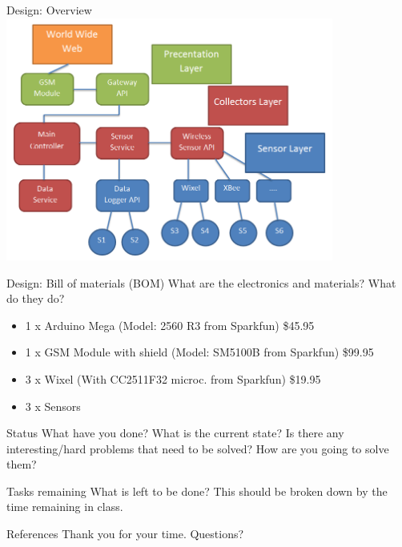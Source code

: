 \documentclass{beamer}
\begin{document}
\begin{frame}{Design: Overview}
\includegraphics[height=8cm]{graphics/softwareArchitecture.png}
\end{frame}

\begin{frame}{Design: Bill of materials (BOM)}
What are the electronics and materials?  What do they do? 

\begin{itemize}
\item 1 x Arduino Mega (Model: 2560 R3 from Sparkfun) \$45.95
\item 1 x GSM Module with shield  (Model: SM5100B from Sparkfun) \$99.95
\item 3 x Wixel   (With CC2511F32 microc. from Sparkfun) \$19.95
\item 3 x Sensors
\end{itemize}
\end{frame}

\begin{frame}{Status}
What have you done?  What is the current state?  Is there any interesting/hard problems
that need to be solved?  How are you going to solve them?
\end{frame}

\begin{frame}{Tasks remaining}
What is left to be done?  This should be broken down by the time remaining in class.
\end{frame}

\begin{frame}{References}
Thank you for your time.
Questions?


\end{frame}
\end{document}
